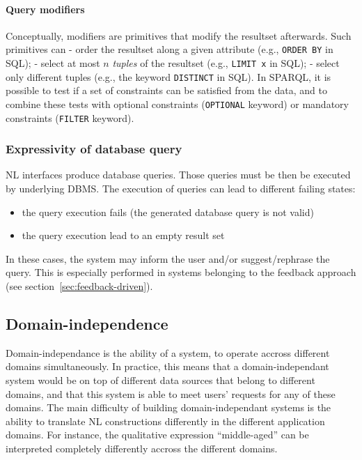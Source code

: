 \documentclass[10pt,journal,letterpaper,compsoc]{IEEEtran}
\begin{document}
\paragraph{Query modifiers}
\label{sec:query-languages-modifiers}
Conceptually, modifiers are primitives that modify the resultset afterwards.
Such primitives can - order the resultset along a given attribute (e.g.,
\verb?ORDER BY? in SQL); - select at most $n$ \emph{tuples} of the resultset
(e.g., \verb?LIMIT x? in SQL); - select only different tuples (e.g., the
keyword \verb?DISTINCT? in SQL).
In SPARQL, it is possible to test if a set of constraints can be satisfied from
the data, and to combine these tests with optional constraints (\verb?OPTIONAL?
keyword) or mandatory constraints (\verb?FILTER? keyword).





\subsubsection{Expressivity of database query}
\label{sec:big-picture-expressivity}




NL interfaces produce database queries.
Those queries must be then be executed by underlying DBMS.
The execution of queries can lead to different failing states:
\begin{itemize}
  \item the query execution fails (the generated database query is not valid)
  \item the query execution lead to an empty result set
\end{itemize}
In these cases, the system may inform the user and/or suggest/rephrase the
query. This is especially performed in systems belonging to the feedback
approach (see section~\ref{sec:feedback-driven}). 


\subsection{Domain-independence}
Domain-independance is the ability of a system, to operate accross different
domains simultaneously. 
In practice, this means that a domain-independant system would be on top of
different data sources that belong to different domains, and that this system is
able to meet users' requests for any of these domains. 
The main difficulty of building domain-independant systems is the ability to
translate NL constructions differently in the different application domains.
For instance, the qualitative expression ``middle-aged'' can be interpreted
completely differently accross the different domains.
\end{document}
